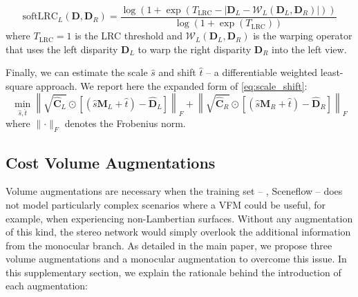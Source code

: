 \documentclass[10pt,twocolumn,letterpaper]{article}
\begin{document}
\small\begin{equation}
    \text{softLRC}_L(\mathbf{D},\mathbf{D}_R) = \frac{\log\left(1+\exp\left(T_\text{LRC}-\left| \mathbf{D}_L - \mathcal{W}_L(\mathbf{D}_L,\mathbf{D}_R) \right|\right)\right)}{\log(1+\exp(T_\text{LRC}))}
    \label{eq:softlrc}
\end{equation}\normalsize
where $T_\text{LRC}=1$ is the LRC threshold and $\mathcal{W}_L(\mathbf{D}_L,\mathbf{D}_R)$ is the warping operator that uses the left disparity $\mathbf{D}_L$ to warp the right disparity $\mathbf{D}_R$ into the left view.

Finally, we can estimate the scale $\hat{s}$ and shift $\hat{t}$  -- a differentiable weighted least-square approach. We report here the expanded form of \cref{eq:scale_shift}:
\small\begin{equation}
    \min_{\hat{s}, \hat{t}} \left\lVert \sqrt{\hat{\mathbf{C}}_L}\odot\left[\left(\hat{s}\mathbf{M}_L + \hat{t}\right)  - \hat{\mathbf{D}}_L \right] \right\rVert_F + \left\lVert \sqrt{\hat{\mathbf{C}}_R}\odot\left[\left(\hat{s}\mathbf{M}_R + \hat{t}\right)  - \hat{\mathbf{D}}_R \right] \right\rVert_F
    \label{eq:scale_shift2}
\end{equation}\normalsize
where $\lVert\cdot\rVert_F$ denotes the Frobenius norm.

\subsection{Cost Volume Augmentations}
\label{subsec:cost_aug}

Volume augmentations are necessary when the training set -- \eg, Sceneflow \cite{mayer2016large} -- does not model particularly complex scenarios where a VFM could be useful, for example, when experiencing non-Lambertian surfaces.
Without any augmentation of this kind, the stereo network would simply overlook the additional information from the monocular branch.
As detailed in the main paper, we propose three volume augmentations and a monocular augmentation to overcome this issue.
In this supplementary section, we explain the rationale behind the introduction of each augmentation:
\end{document}
